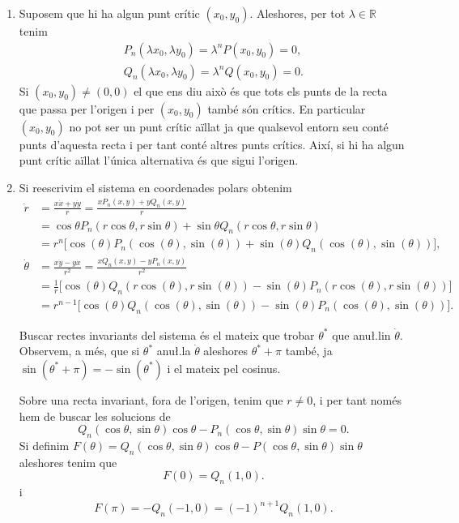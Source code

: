 \documentclass[12pt]{article}
\newcommand{\R}{\mathbb{R}}
\begin{document}
\begin{enumerate}[label=(\roman*), font=\bfseries \sffamily, wide, labelwidth=!, labelindent=0pt]
	\item Suposem que hi ha algun punt crític \( (x_0, y_0) \). Aleshores, per tot \( \lambda \in \R \) tenim
		\begin{gather*}
			P_n(\lambda x_0, \lambda y_0) = \lambda^n P(x_0, y_0) = 0, \\
			Q_n(\lambda x_0, \lambda y_0) = \lambda^n Q(x_0, y_0) = 0. 
		\end{gather*}
		Si \( (x_0, y_0) \neq (0,0) \) el que ens diu això és que tots els punts de la recta que passa per l'origen i per \( (x_0, y_0) \) també són crítics. En particular \( (x_0, y_0) \) no pot ser un punt crític aïllat ja que qualsevol entorn seu conté punts d'aquesta recta i per tant conté altres punts crítics. Així, si hi ha algun punt crític aïllat l'única alternativa és que sigui l'origen. 	

	\item Si reescrivim el sistema en coordenades polars obtenim
		\begin{align*}
			\dot{r} & = \frac{x\dot{x} + y \dot{y}}{r} = \frac{xP_n(x,y) + yQ_n(x,y)}{r} \\
							& = \cos{\theta} P_n(r\cos{\theta}, r \sin{\theta}) + \sin{\theta} Q_n(r \cos{\theta}, r \sin{\theta}) \\
							& = r^n  \big[\cos{(\theta)} P_n(\cos{(\theta)}, \sin{(\theta)}) + \sin{(\theta)} Q_n(\cos{(\theta)}, \sin{(\theta)})\big], \\
			\dot{\theta} & = \frac{x\dot{y} - y \dot{x}}{r^2} = \frac{x Q_n(x,y) - y P_n(x,y)}{r^2} \\
									 & = \frac{1}{r} \big[ \cos{(\theta)} Q_n(r \cos{(\theta)}, r \sin{(\theta)}) - \sin{(\theta)} P_n(r \cos{(\theta)}, r \sin{(\theta)})  \big] \\
									 & = r^{n - 1} \big[ \cos{(\theta)} Q_n(\cos{(\theta)}, \sin{(\theta)}) - \sin{(\theta)} P_n(\cos{(\theta)}, \sin{(\theta)})  \big]. 
		\end{align*}

		Buscar rectes invariants del sistema és el mateix que trobar \( \theta^\ast \) que anu\l.lin \( \dot{\theta} \). Observem, a més, que si \( \theta^\ast \) anu\l.la \( \dot{\theta} \) aleshores \( \theta^\ast + \pi \) també, ja \( \sin{(\theta^\ast + \pi)} = - \sin{(\theta^\ast)} \) i el mateix pel cosinus.   

		Sobre una recta invariant, fora de l'origen, tenim que \( r \neq 0 \), i per tant només hem de buscar les solucions de 
		\begin{equation*}
			Q_n(\cos{\theta}, \sin{\theta}) \cos{\theta} - P_n(\cos{\theta}, \sin{\theta}) \sin{\theta} = 0.
		\end{equation*}
		Si definim \( F(\theta) =	Q_n(\cos{\theta}, \sin{\theta}) \cos{\theta} - P(\cos{\theta}, \sin{\theta}) \sin{\theta} \) aleshores tenim que 
		\begin{equation*}
			F(0) = Q_n(1, 0).
		\end{equation*}
		i 
		\begin{equation*}
			F(\pi) = - Q_{n}(-1, 0) = (-1)^{n+1}Q_n(1,0).
		\end{equation*}


\end{enumerate}
\end{document}
